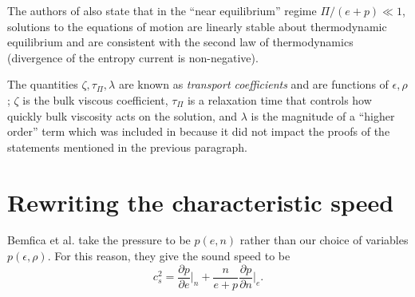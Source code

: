 \documentclass[12pt]{article}
\numberwithin{equation}{section}
\begin{document}
The authors of \cite{Bemfica19} also state that in the ``near equilibrium'' regime $\Pi/(e+p) \ll 1$, solutions to the equations of motion are linearly stable about thermodynamic equilibrium and are consistent with the second law of thermodynamics (divergence of the entropy current is non-negative).

The quantities $\zeta, \tau_{\Pi}, \lambda$ are known as \textit{transport coefficients} and are functions of $\epsilon, \rho$; $\zeta$ is the bulk viscous coefficient, $\tau_{\Pi}$ is a relaxation time that controls how quickly bulk viscosity acts on the solution, and $\lambda$ is the magnitude of a ``higher order'' term which was included in \cite{Bemfica19} because it did not impact the proofs of the statements mentioned in the previous paragraph.

\section{Rewriting the characteristic speed}

Bemfica et al. \cite{Bemfica19} take the pressure to be $p(e,n)$ rather than our choice of variables $p(\epsilon, \rho)$.
For this reason, they give the sound speed to be
\begin{equation} \label{eq:BDN_csSq}
c_s^2 = \frac{\partial p}{\partial e} \Big|_n + \frac{n}{e+p} \frac{\partial p}{\partial n} \Big|_e.
\end{equation}
\end{document}
